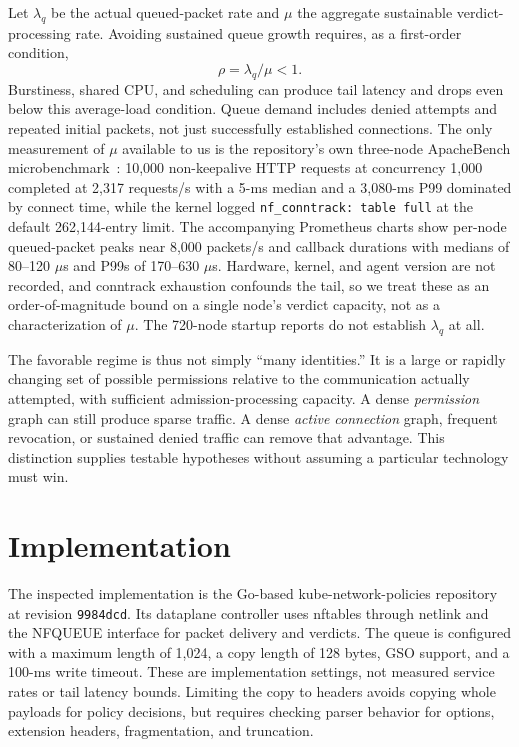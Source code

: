 \documentclass[letterpaper,twocolumn,10pt]{article}
\begin{document}
Let $\lambda_q$ be the actual queued-packet rate and $\mu$ the aggregate
sustainable verdict-processing rate. Avoiding sustained queue growth
requires, as a first-order condition,
\begin{equation}
\rho = \lambda_q/\mu < 1.
\end{equation}
Burstiness, shared CPU, and scheduling can produce tail latency and drops
even below this average-load condition. Queue demand includes denied
attempts and repeated initial packets, not just successfully established
connections. The only measurement of $\mu$ available to us is the
repository's own three-node ApacheBench microbenchmark~\cite{knptesting}:
10,000 non-keepalive HTTP requests at concurrency 1,000 completed at
2,317 requests/s with a 5-ms median and a 3,080-ms P99 dominated by
connect time, while the kernel logged \texttt{nf\_conntrack: table
full} at the default 262,144-entry limit. The accompanying Prometheus
charts show per-node queued-packet peaks near 8,000 packets/s and
callback durations with medians of 80--120 $\mu$s and P99s of
170--630 $\mu$s. Hardware, kernel, and agent version are not recorded,
and conntrack exhaustion confounds the tail, so we treat these as an
order-of-magnitude bound on a single node's verdict capacity, not as a
characterization of $\mu$. The 720-node startup reports do not
establish $\lambda_q$ at all.

The favorable regime is thus not simply ``many identities.'' It is a
large or rapidly changing set of possible permissions relative to the
communication actually attempted, with sufficient admission-processing
capacity. A dense \emph{permission} graph can still produce sparse traffic.
A dense \emph{active connection} graph, frequent revocation, or sustained
denied traffic can remove that advantage. This distinction supplies
testable hypotheses without assuming a particular technology must win.

\section{Implementation}
\label{sec:implementation}
The inspected implementation is the Go-based kube-network-policies
repository at revision \texttt{9984dcd}. Its dataplane controller uses
nftables through netlink and the NFQUEUE interface for packet delivery
and verdicts. The queue is configured with a maximum length of 1,024,
a copy length of 128 bytes, GSO support, and a 100-ms write timeout.
These are implementation settings, not measured service rates or tail
latency bounds. Limiting the copy to headers avoids copying whole
payloads for policy decisions, but requires checking parser behavior
for options, extension headers, fragmentation, and truncation.
\end{document}
